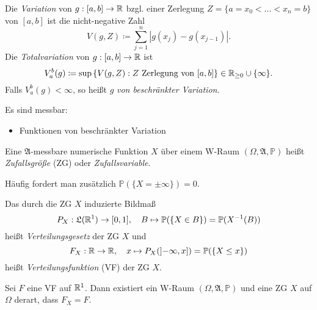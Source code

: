 \documentclass{cheat-sheet}
\newcommand{\Alg}{\mathfrak{A}} %
\newcommand{\LebAlg}{\mathfrak{L}} %
\renewcommand{\P}{\mathbb{P}}
\begin{document}
\begin{defn}
Die \emph{Variation} von $g : [a, b] \to \mathbb{R}$ bzgl. einer Zerlegung $Z = \{ a = x_0 < ... < x_n = b \}$ von $[a, b]$ ist die nicht-negative Zahl
\[ V(g, Z) \coloneqq \sum_{j=1}^{n} |g(x_j) - g(x_{j-1})|. \]
Die \emph{Totalvariation} von $g : [a, b] \to \mathbb{R}$ ist
\[ V_a^b(g) \coloneqq \sup\left\{ V(g, Z) : Z \text{ Zerlegung von } [a, b] \right\} \in \mathbb{R}_{\ge 0} \cup \{ \infty \}. \]
Falls $V_a^b(g) < \infty$, so heißt $g$ \emph{von beschränkter Variation}.
\end{defn}

\begin{satz}
  Es sind messbar:
  \begin{itemize}
    \item Funktionen von beschränkter Variation
  \end{itemize}
\end{satz}

\begin{defn}
  Eine $\Alg$-messbare numerische Funktion $X$ über einem W-Raum $(\Omega, \Alg, \P)$ heißt \emph{Zufallsgröße} (ZG) oder \emph{Zufallsvariable}.
\end{defn}


\begin{bem}
  Häufig fordert man zusätzlich $\P(\{ X = \pm \infty \}) = 0$.
\end{bem}

\begin{defn}
  Das durch die ZG $X$ induzierte Bildmaß
  \[ P_X : \LebAlg(\R^1) \to [0,1], \quad B \mapsto \P(\{ X \in B \}) = \P(X^{-1}(B)) \]
  heißt \emph{Verteilungsgesetz} der ZG $X$ und
  \[ F_X : \R \to \R, \quad x \mapsto P_X(\left]-\infty, x\right]) = \P(\{ X \leq x \}) \]
  heißt \emph{Verteilungsfunktion} (VF) der ZG $X$.
\end{defn}


\begin{satz}
  Sei $F$ eine VF auf $\mathbb{R}^1$. Dann existiert ein W-Raum $(\Omega, \Alg, \P)$ und eine ZG $X$ auf $\Omega$ derart, dass $F_X = F$.
\end{satz}
\end{document}
